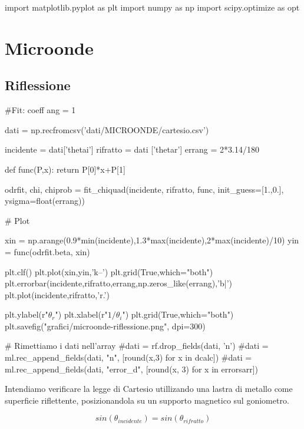 \begin{sagesilent}
import matplotlib.pyplot as plt
import numpy as np
import scipy.optimize as opt
\end{sagesilent}


\chapter{Microonde}

\section{Riflessione}
\begin{sagesilent}
#Fit: coeff ang = 1

dati = np.recfromcsv('dati/MICROONDE/cartesio.csv')

incidente = dati['thetai']
rifratto = dati ['thetar']
errang = 2*3.14/180

def func(P,x):
    return P[0]*x+P[1]

odrfit, chi, chiprob = fit_chiquad(incidente, rifratto, func, init_guess=[1.,0.], ysigma=float(errang))


# Plot

xin = np.arange(0.9*min(incidente),1.3*max(incidente),2*max(incidente)/10)
yin = func(odrfit.beta, xin)

plt.clf()
plt.plot(xin,yin,'k--')
plt.grid(True,which="both")
plt.errorbar(incidente,rifratto,errang,np.zeros_like(errang),'b|')
plt.plot(incidente,rifratto,'r.')

plt.ylabel(r"$\theta_r$")
plt.xlabel(r"$1/\theta_i$")
plt.grid(True,which="both")
plt.savefig("grafici/microonde-riflessione.png", dpi=300)


# Rimettiamo i dati nell'array
#dati = rf.drop_fields(dati, 'n')
#dati = ml.rec_append_fields(dati, "n", [round(x,3) for x in dcalc])
#dati = ml.rec_append_fields(dati, "error_d", [round(x, 3) for x in errorsarr])

\end{sagesilent}


Intendiamo verificare la legge di Cartesio utillizando una lastra di metallo come superficie riflettente, posizionandola su un supporto magnetico sul goniometro.

\begin{equation}
sin(\theta_{incidente}) = sin(\theta_{rifratto})
\end{equation}

\begin{center}
\end{center}


